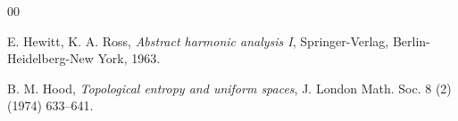 \documentclass[11pt]{article}
\theoremstyle{definition}
\numberwithin{equation}{section}
\begin{document}
\begin{thebibliography}{00}
{%









  E. Hewitt, K. A. Ross, \emph{Abstract harmonic analysis I}, Springer-Verlag, Berlin-Heidelberg-New York, 1963.

 B. M. Hood,  \emph{Topological entropy and uniform spaces}, J. London Math. Soc. 8 (2) (1974) 633--641. 





}
\end{thebibliography}
\end{document}
